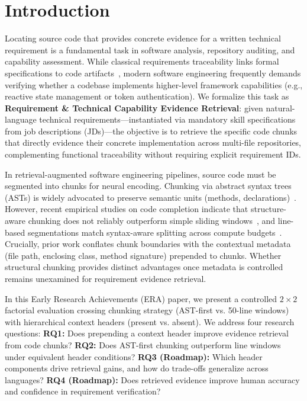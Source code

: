 \section{Introduction}
\label{sec:intro}

Locating source code that provides concrete evidence for a written technical requirement is a fundamental task in software analysis, repository auditing, and capability assessment. 
While classical requirements traceability links formal specifications to code artifacts~\cite{antoniol2002traceability,gao2024triad,kuang2023analyzing}, modern software engineering frequently demands verifying whether a codebase implements higher-level framework capabilities (e.g., reactive state management or token authentication). 
We formalize this task as \textbf{Requirement \& Technical Capability Evidence Retrieval}: given natural-language technical requirements---instantiated via mandatory skill specifications from job descriptions (JDs)---the objective is to retrieve the specific code chunks that directly evidence their concrete implementation across multi-file repositories, complementing functional traceability without requiring explicit requirement IDs.

In retrieval-augmented software engineering pipelines, source code must be segmented into chunks for neural encoding. 
Chunking via abstract syntax trees (ASTs) is widely advocated to preserve semantic units (methods, declarations)~\cite{zhang2025cast}. 
However, recent empirical studies on code completion indicate that structure-aware chunking does not reliably outperform simple sliding windows~\cite{wu2026chunking}, and line-based segmentations match syntax-aware splitting across compute budgets~\cite{galimzyanov2025practical}. 
Crucially, prior work conflates chunk boundaries with the contextual metadata (file path, enclosing class, method signature) prepended to chunks. 
Whether structural chunking provides distinct advantages once metadata is controlled remains unexamined for requirement evidence retrieval.

In this Early Research Achievements (ERA) paper, we present a controlled $2 \times 2$ factorial evaluation crossing chunking strategy (AST-first vs. 50-line windows) with hierarchical context headers (present vs. absent). We address four research questions:
\textbf{RQ1:} Does prepending a context header improve evidence retrieval from code chunks?
\textbf{RQ2:} Does AST-first chunking outperform line windows under equivalent header conditions?
\textbf{RQ3 (Roadmap):} Which header components drive retrieval gains, and how do trade-offs generalize across languages?
\textbf{RQ4 (Roadmap):} Does retrieved evidence improve human accuracy and confidence in requirement verification?

